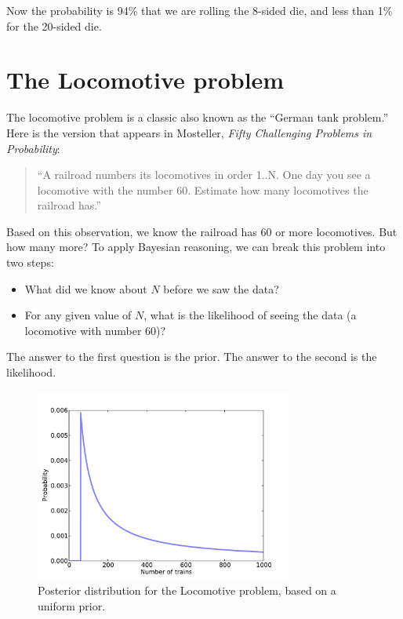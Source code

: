 \documentclass[12pt]{book}
\begin{document}
Now the probability is 94\% that we are rolling the 8-sided die,
and less than 1\% for the 20-sided die.


\section{The Locomotive problem}

The locomotive problem is a classic also
known as the ``German tank problem.''  Here is the version
that appears in Mosteller, {\it Fifty Challenging Problems in
  Probability}:

\begin{quote}
``A railroad numbers its locomotives in order 1..N.  One day you see a
locomotive with the number 60.  Estimate how many locomotives the
railroad has.''
\end{quote}

Based on this observation, we know the railroad has 60 or more
locomotives.  But how many more?  To apply Bayesian reasoning, we
can break this problem into two steps:

\begin{itemize}

\item What did we know about $N$ before we saw the data?

\item For any given value of $N$, what is the likelihood of
seeing the data (a locomotive with number 60)?

\end{itemize}

The answer to the first question is the prior.  The answer to the
second is the likelihood.

\begin{figure}
\centerline{\includegraphics[height=2.5in]{figs/train1.pdf}}
\caption{Posterior distribution for the Locomotive problem, based
on a uniform prior.}
\label{fig.train1}
\end{figure}
\end{document}
